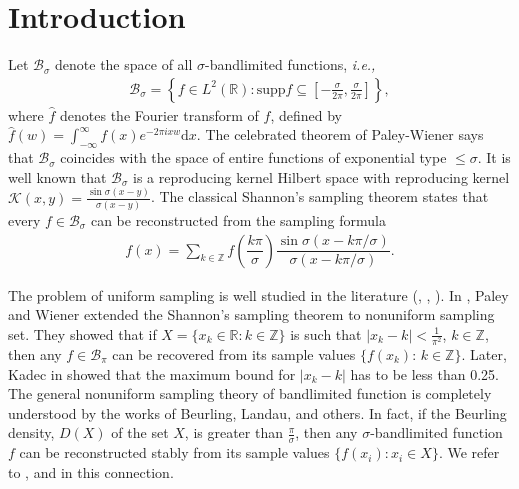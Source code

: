 \documentclass[a4paper,12pt,reqno]{amsart}
\theoremstyle{plain}
\numberwithin{equation}{section}
\theoremstyle{definition}
\newcounter {own}
\newcommand{\ds}{\displaystyle}
\begin{document}
%
%
\section{Introduction}
Let $\mathcal{B}_\sigma$ denote the space of all $\sigma$-bandlimited functions, \textit{i.e.,}
\begin{eqnarray*}
\mathcal{B}_\sigma=\left\{f\in L^2(\mathbb{R}): \textrm{supp}\widehat{f}\subseteq [-\tfrac{\sigma}{2\pi},\tfrac{\sigma}{2\pi}]\right\},
\end{eqnarray*}
where $\widehat{f}$ denotes the Fourier transform of $f$, defined by $\widehat{f}(w)=\int_{-\infty}^\infty f(x)e^{-2\pi ixw}\mathrm{d}x$. The celebrated theorem of Paley-Wiener says that $\mathcal{B}_\sigma$ coincides with the space of
entire functions  of exponential type $\leq\sigma$. It is well known that $\mathcal{B}_\sigma$ is a reproducing kernel Hilbert space with reproducing kernel $\mathcal{K}(x,y)=\tfrac{\sin\sigma\left(x-y\right)}{\sigma \left(x-y\right)}$. 
The classical Shannon's sampling theorem states that every $f\in\mathcal{B}_\sigma$ can be reconstructed from the sampling formula
\begin{eqnarray*}
f(x)=\ds\sum_{k\in\mathbb{Z}}f\left(\dfrac{k\pi}{\sigma}\right)\dfrac{\sin \sigma\left(x-k\pi/\sigma\right)}{\sigma \left(x-k\pi/\sigma\right)}.
\end{eqnarray*}

The problem of uniform sampling is well studied in the literature (\cite{Higg}, \cite{Jerri}, \cite{Papoulis}). In \cite{PaWi}, Paley and Wiener  extended the Shannon's sampling theorem to nonuniform sampling set.
They showed that if $X=\{x_k\in\mathbb{R}:k\in\mathbb{Z}\}$ is such that $|x_k-k|<\tfrac{1}{\pi^2}$, $k\in\mathbb{Z}$, then any $f\in\mathcal{B}_{\pi}$ can be recovered from its sample values $\{f(x_k)$: $k\in\mathbb{Z}\}$.
Later, Kadec in \cite{Kadec} showed that the maximum bound for $|x_k-k|$ has to be less than 0.25.
The general nonuniform sampling theory of bandlimited function is completely understood by the works of Beurling, Landau, and others. 
In fact, if the Beurling density, $D(X)$ of the set $X$, is greater than $\tfrac{\pi}{\sigma}$, then any $\sigma$-bandlimited function $f$ can be reconstructed stably from its sample
values $\{f(x_i) : x_i \in X\}$. We refer to \cite{Beurling}, \cite{Landau} and \cite{Ortega} in this connection.
\end{document}
